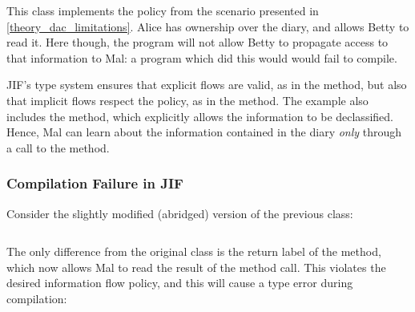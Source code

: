 This class implements the policy from the scenario presented in \ref{theory_dac_limitations}. Alice has ownership over the diary, and allows Betty to read it. Here though, the program will not allow Betty to propagate access to that information to Mal: a program which did this would would fail to compile.

JIF's type system ensures that explicit flows are valid, as in the  method, but also that implicit flows respect the policy, as in the  method. The example also includes the  method, which explicitly allows the information to be declassified. Hence, Mal can learn about the information contained in the diary \textit{only} through a call to the  method.

\newpage

\subsubsection{Compilation Failure in JIF}

Consider the slightly modified (abridged) version of the previous class:

\inputminted{java}{content/code_sections/jif_para_bg/DiaryError.jif}

The only difference from the original  class is the return label of the  method, which now allows Mal to read the result of the method call. This violates the desired information flow policy, and this will cause a type error during compilation:

\inputminted[fontsize=\footnotesize]{text}{content/code_sections/jif_para_bg/DiaryError_message_jif.txt}